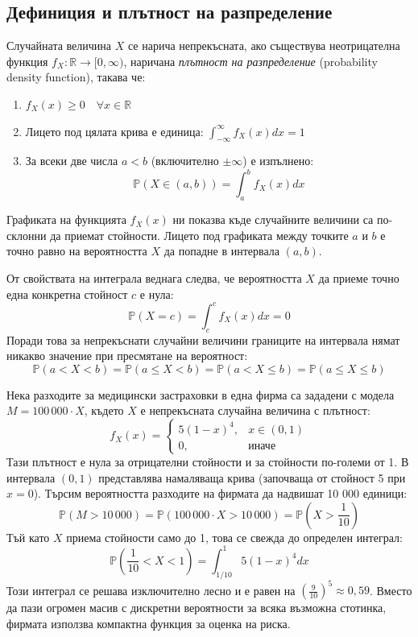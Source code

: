 \subsection{Дефиниция и плътност на разпределение}

\begin{defn}
Случайната величина $X$ се нарича непрекъсната, ако съществува неотрицателна функция $f_X: \mathbb{R} \to [0, \infty)$, наричана \emph{плътност на разпределение} (probability density function), такава че:
\begin{enumerate}
    \item $f_X(x) \ge 0 \quad \forall x \in \mathbb{R}$
    \item Лицето под цялата крива е единица: $\int_{-\infty}^{\infty} f_X(x) dx = 1$
    \item За всеки две числа $a < b$ (включително $\pm\infty$) е изпълнено:
    \[
    \mathbb{P}(X \in (a, b)) = \int_{a}^{b} f_X(x) dx
    \]
\end{enumerate}
\end{defn}

Графиката на функцията $f_X(x)$ ни показва къде случайните величини са по-склонни да приемат стойности. Лицето под графиката между точките $a$ и $b$ е точно равно на вероятността $X$ да попадне в интервала $(a,b)$.

От свойствата на интеграла веднага следва, че вероятността $X$ да приеме точно една конкретна стойност $c$ е нула:
\[
\mathbb{P}(X = c) = \int_{c}^{c} f_X(x) dx = 0
\]
Поради това за непрекъснати случайни величини границите на интервала нямат никакво значение при пресмятане на вероятност:
\[
\mathbb{P}(a < X < b) = \mathbb{P}(a \le X < b) = \mathbb{P}(a < X \le b) = \mathbb{P}(a \le X \le b)
\]

\begin{example}
Нека\label{ex:08-3} разходите за медицински застраховки в една фирма са зададени с модела $M = 100\,000 \cdot X$, където $X$ е непрекъсната случайна величина с плътност:
\[
f_X(x) = \begin{cases}
5(1-x)^4, & x \in (0,1) \\
0, & \text{иначе}
\end{cases}
\]
Тази плътност е нула за отрицателни стойности и за стойности по-големи от 1. В интервала $(0,1)$ представлява намаляваща крива (започваща от стойност 5 при $x=0$). Търсим вероятността разходите на фирмата да надвишат 10 000 единици:
\[
\mathbb{P}(M > 10\,000) = \mathbb{P}\left(100\,000 \cdot X > 10\,000\right) = \mathbb{P}\left(X > \frac{1}{10}\right)
\]
Тъй като $X$ приема стойности само до 1, това се свежда до определен интеграл:
\[
\mathbb{P}\left(\frac{1}{10} < X < 1\right) = \int_{1/10}^{1} 5(1-x)^4 dx
\]
Този интеграл се решава изключително лесно и е равен на $\left(\frac{9}{10}\right)^5 \approx 0{,}59$.
Вместо да пази огромен масив с дискретни вероятности за всяка възможна стотинка, фирмата използва компактна функция за оценка на риска.

\end{example}


